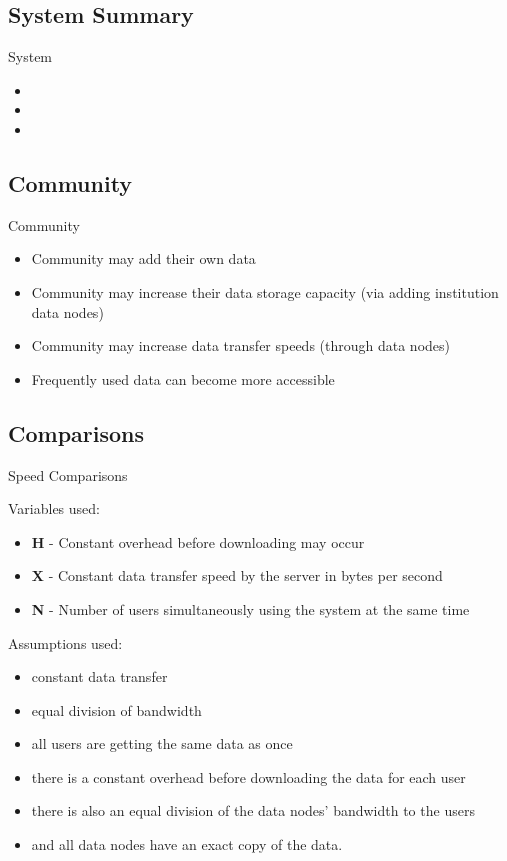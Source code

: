 \documentclass{beamer}
\begin{document}
\subsection{System Summary}
\begin{frame}{System}
  \begin{itemize}   
    \item 
    \item 
    \item 
  \end{itemize}
\end{frame}


\subsection{Community}
\begin{frame}{Community}
  \begin{itemize}   
    \item Community may add their own data
    \item Community may increase their data storage capacity (via adding institution data nodes)
    \item Community may increase data transfer speeds (through data nodes)
    \item Frequently used data can become more accessible
  \end{itemize}
\end{frame}

\subsection{Comparisons}
\begin{frame}{Speed Comparisons}

Variables used:
  \begin{itemize}   
    \item \textbf{H} - Constant overhead before downloading may occur
    \item \textbf{X} - Constant data transfer speed by the server in bytes per second
    \item \textbf{N} - Number of users simultaneously using the system at the same time
  \end{itemize}
  
Assumptions used:
\begin{itemize}
    \item constant data transfer
    \item equal division of bandwidth
    \item all users are getting the same data as once
    \item there is a constant overhead before downloading the data for each user
    \item there is also an equal division of the data nodes' bandwidth to the users
    \item and all data nodes have an exact copy of the data.
\end{itemize}
    
\end{frame}
\end{document}
